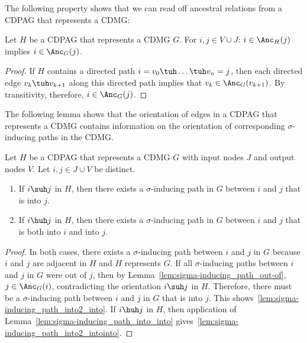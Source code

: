 The following property shows that we can read off ancestral relations from a CDPAG that represents a CDMG:
\begin{Lem}\label{lem:dpag_ancestral_relations}
  Let $H$ be a CDPAG that represents a CDMG $G$. 
  For $i,j \in V \cup J$: $i \in \Anc_{H}(j)$ implies $i \in \Anc_{G}(j)$.
\end{Lem}
\begin{proof}
  If $H$ contains a directed path $i = v_0 \tuh \dots \tuh v_n = j$,
  then each directed edge $v_k \tuh v_{k+1}$ along this directed path implies that $v_k \in \Anc_G(v_{k+1})$. 
  By transitivity, therefore, $i \in \Anc_G(j)$. 
\end{proof}
The following lemma shows that the orientation of edges in a CDPAG that represents a CDMG contains information on the orientation of corresponding $\sigma$-inducing paths in the CDMG.
\begin{Lem}\label{lem:sigma-inducing_path_into}
  Let $H$ be a CDPAG that represents a CDMG $G$ with input nodes $J$ and output nodes $V$.
  Let $i,j \in J \cup V$ be distinct. 
  \begin{enumerate}[label=(\roman*)]
    \item If $i \suh j$ in $H$, then there exists a $\sigma$-inducing path in $G$ between $i$ and $j$ that is into $j$. \label{lem:sigma-inducing_path_into2_into}
    \item If $i \huh j$ in $H$, then there exists a $\sigma$-inducing path in $G$ between $i$ and $j$ that is both into $i$ and into $j$. \label{lem:sigma-inducing_path_into2_intointo}
  \end{enumerate}
\end{Lem}
\begin{proof}
  In both cases, there exists a $\sigma$-inducing path between $i$ and $j$ in $G$ because $i$ and $j$ are adjacent in $H$ and $H$ represents $G$.
  If all $\sigma$-inducing paths between $i$ and $j$ in $G$ were out of $j$, then by Lemma~\ref{lem:sigma-inducing_path_out-of},
  $j \in \Anc_G(i)$, contradicting the orientation $i \suh j$ in $H$. 
  Therefore, there must be a $\sigma$-inducing path between $i$ and $j$ in $G$ that is into $j$.
  This shows~\ref{lem:sigma-inducing_path_into2_into}.
  If $i \huh j$ in $H$, then application of Lemma~\ref{lem:sigma-inducing_path_into_into} gives~\ref{lem:sigma-inducing_path_into2_intointo}.
\end{proof}

